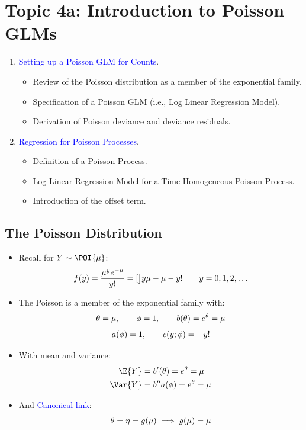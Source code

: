 \documentclass[oneside]{book}\usepackage[]{graphicx}\usepackage[svgnames]{xcolor}
\let\exp\relax%
\let\log\relax%
\begin{document}
\section*{Topic 4a: Introduction to Poisson GLMs}
\begin{enumerate}[1.]
      \item \textcolor{Blue}{Setting up a Poisson GLM for Counts}.
            \begin{itemize}
                  \item Review of the Poisson distribution as a member of the exponential family.
                  \item Specification of a Poisson GLM (i.e., Log Linear Regression Model).
                  \item Derivation of Poisson deviance and deviance residuals.
            \end{itemize}
      \item \textcolor{Blue}{Regression for Poisson Processes}.
            \begin{itemize}
                  \item Definition of a Poisson Process.
                  \item Log Linear Regression Model for a Time Homogeneous Poisson Process.
                  \item Introduction of the offset term.
            \end{itemize}
\end{enumerate}
\subsection*{The Poisson Distribution}
\begin{itemize}
      \item Recall for $ Y \sim \POI{\mu} $:
            \[ f(y)=\frac{\mu^y e^{-\mu}}{y!}=\exp[\big]{y\log{\mu}-\mu-\log{y!}}\qquad y=0,1,2,\ldots  \]
      \item The Poisson is a member of the exponential family with:
            \[ \theta=\log{\mu},\qquad \phi=1,\qquad b(\theta)=e^{\theta}=\mu \]
            \[ a(\phi)=1,\qquad c(y;\phi)=-\log{y!} \]
      \item With mean and variance:
            \begin{align*}
                  \E{Y}   & =b^\prime(\theta)=e^{\theta}=\mu        \\
                  \Var{Y} & =b^{\prime\prime}a(\phi)=e^{\theta}=\mu
            \end{align*}
      \item And \textcolor{Blue}{Canonical link}:
            \[ \theta=\eta=g(\mu)\implies g(\mu)=\log{\mu} \]
\end{itemize}
\end{document}
